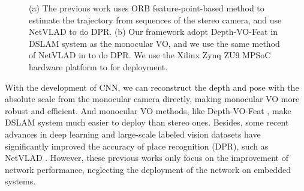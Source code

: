 \begin{figure}[thb]
    \begin{minipage}[t]{0.5\linewidth}  
    \centering
    \end{minipage}
    \begin{minipage}[t]{0.5\linewidth}  
    \centering  
    \end{minipage}
    \caption{(a) The previous work uses ORB feature-point-based method to estimate the trajectory from sequences of the stereo camera, and use NetVLAD \cite{Arandjelovic:2017997} to do DPR. (b) Our framework adopt Depth-VO-Feat \cite{Zhan:2018e92} in DSLAM system as the monocular VO, and we use the same method of NetVLAD in \cite{Cieslewski:20187ee} to do DPR. We use the Xilinx Zynq ZU9 MPSoC hardware platform to for deployment.
    }
\label{fig:overview}
\end{figure}


With the development of CNN, we can reconstruct the depth and pose with the absolute scale from the monocular camera directly, making monocular VO more robust and efficient. And monocular VO methods, like Depth-VO-Feat \cite{Zhan:2018e92}, make DSLAM system much easier to deploy than stereo ones. Besides, some recent advances in deep learning and large-scale labeled vision datasets have significantly improved the accuracy of place recognition (DPR), such as NetVLAD \cite{Arandjelovic:2017997}. However, these previous works only focus on the improvement of network performance, neglecting the deployment of the network on embedded systems.

